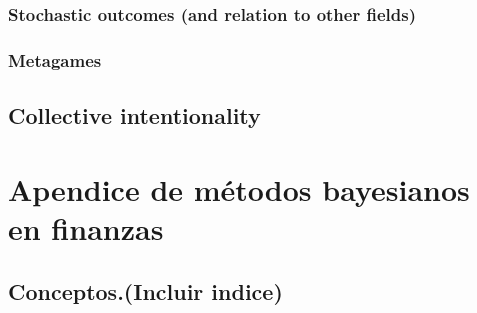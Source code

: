         \subsection{Stochastic outcomes (and relation to other fields)}
        \subsection{Metagames}
    \section{Collective intentionality}
        
\chapter{Apendice de métodos bayesianos en finanzas}
    \section{Conceptos.(Incluir indice)}